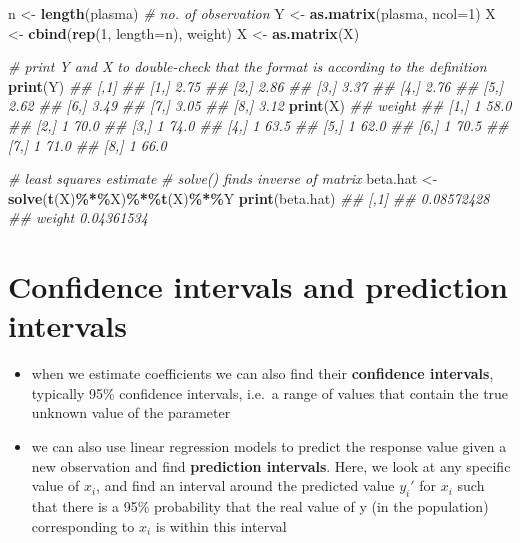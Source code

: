 \documentclass[
]{book}
\newenvironment{Shaded}{\begin{snugshade}}{\end{snugshade}}
\newcommand{\CommentTok}[1]{\textcolor[rgb]{0.56,0.35,0.01}{\textit{#1}}}
\newcommand{\DataTypeTok}[1]{\textcolor[rgb]{0.13,0.29,0.53}{#1}}
\newcommand{\DecValTok}[1]{\textcolor[rgb]{0.00,0.00,0.81}{#1}}
\newcommand{\KeywordTok}[1]{\textcolor[rgb]{0.13,0.29,0.53}{\textbf{#1}}}
\newcommand{\NormalTok}[1]{#1}
\newcommand{\OperatorTok}[1]{\textcolor[rgb]{0.81,0.36,0.00}{\textbf{#1}}}
\newcommand{\StringTok}[1]{\textcolor[rgb]{0.31,0.60,0.02}{#1}}
\providecommand{\tightlist}{%
  \setlength{\itemsep}{0pt}\setlength{\parskip}{0pt}}
\theoremstyle{definition}
\theoremstyle{definition}
\theoremstyle{definition}
\theoremstyle{remark}
\begin{document}
\begin{Shaded}
\begin{Highlighting}[]
\NormalTok{n \textless{}{-}}\StringTok{ }\KeywordTok{length}\NormalTok{(plasma) }\CommentTok{\# no. of observation}
\NormalTok{Y \textless{}{-}}\StringTok{ }\KeywordTok{as.matrix}\NormalTok{(plasma, }\DataTypeTok{ncol=}\DecValTok{1}\NormalTok{)}
\NormalTok{X \textless{}{-}}\StringTok{ }\KeywordTok{cbind}\NormalTok{(}\KeywordTok{rep}\NormalTok{(}\DecValTok{1}\NormalTok{, }\DataTypeTok{length=}\NormalTok{n), weight)}
\NormalTok{X \textless{}{-}}\StringTok{ }\KeywordTok{as.matrix}\NormalTok{(X)}

\CommentTok{\# print Y and X to double{-}check that the format is according to the definition}
\KeywordTok{print}\NormalTok{(Y) }
\CommentTok{\#\#      [,1]}
\CommentTok{\#\# [1,] 2.75}
\CommentTok{\#\# [2,] 2.86}
\CommentTok{\#\# [3,] 3.37}
\CommentTok{\#\# [4,] 2.76}
\CommentTok{\#\# [5,] 2.62}
\CommentTok{\#\# [6,] 3.49}
\CommentTok{\#\# [7,] 3.05}
\CommentTok{\#\# [8,] 3.12}
\KeywordTok{print}\NormalTok{(X) }
\CommentTok{\#\#        weight}
\CommentTok{\#\# [1,] 1   58.0}
\CommentTok{\#\# [2,] 1   70.0}
\CommentTok{\#\# [3,] 1   74.0}
\CommentTok{\#\# [4,] 1   63.5}
\CommentTok{\#\# [5,] 1   62.0}
\CommentTok{\#\# [6,] 1   70.5}
\CommentTok{\#\# [7,] 1   71.0}
\CommentTok{\#\# [8,] 1   66.0}

\CommentTok{\# least squares estimate}
\CommentTok{\# solve() finds inverse of matrix}
\NormalTok{beta.hat \textless{}{-}}\StringTok{ }\KeywordTok{solve}\NormalTok{(}\KeywordTok{t}\NormalTok{(X)}\OperatorTok{\%*\%}\NormalTok{X)}\OperatorTok{\%*\%}\KeywordTok{t}\NormalTok{(X)}\OperatorTok{\%*\%}\NormalTok{Y }
\KeywordTok{print}\NormalTok{(beta.hat)}
\CommentTok{\#\#              [,1]}
\CommentTok{\#\#        0.08572428}
\CommentTok{\#\# weight 0.04361534}
\end{Highlighting}
\end{Shaded}

\hypertarget{confidence-intervals-and-prediction-intervals}{%
\section{Confidence intervals and prediction intervals}\label{confidence-intervals-and-prediction-intervals}}

\begin{itemize}
\tightlist
\item
  when we estimate coefficients we can also find their \textbf{confidence intervals}, typically 95\% confidence intervals, i.e.~a range of values that contain the true unknown value of the parameter
\item
  we can also use linear regression models to predict the response value given a new observation and find \textbf{prediction intervals}. Here, we look at any specific value of \(x_i\), and find an interval around the predicted value \(y_i'\) for \(x_i\) such that there is a 95\% probability that the real value of y (in the population) corresponding to \(x_i\) is within this interval
\end{itemize}
\end{document}
